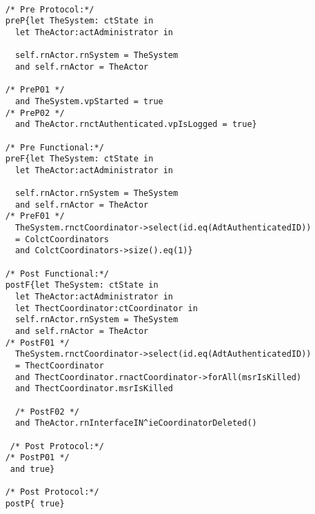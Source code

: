 	\scriptsize
	\vspace{0.5cm}
	\begin{lstlisting}[style=MessirStyle,firstnumber=auto,captionpos=b,caption={\msrmessir (MCL-oriented) specification of the operation \emph{oeDeleteCoordinator}.},label=OM-actAdministrator-oeDeleteCoordinator-MCL-LST]

	/* Pre Protocol:*/ 
	preP{let TheSystem: ctState in
	  let TheActor:actAdministrator in
	  
	  self.rnActor.rnSystem = TheSystem
	  and self.rnActor = TheActor
	  
	/* PreP01 */
	  and TheSystem.vpStarted = true
	/* PreP02 */
	  and TheActor.rnctAuthenticated.vpIsLogged = true}
	
	/* Pre Functional:*/
	preF{let TheSystem: ctState in
	  let TheActor:actAdministrator in
	   
	  self.rnActor.rnSystem = TheSystem
	  and self.rnActor = TheActor
	/* PreF01 */
	  TheSystem.rnctCoordinator->select(id.eq(AdtAuthenticatedID))
	  = ColctCoordinators
	  and ColctCoordinators->size().eq(1)}
	
	/* Post Functional:*/ 
	postF{let TheSystem: ctState in
	  let TheActor:actAdministrator in
	  let ThectCoordinator:ctCoordinator in
	  self.rnActor.rnSystem = TheSystem
	  and self.rnActor = TheActor
	/* PostF01 */
	  TheSystem.rnctCoordinator->select(id.eq(AdtAuthenticatedID))
	  = ThectCoordinator
	  and ThectCoordinator.rnactCoordinator->forAll(msrIsKilled)
	  and ThectCoordinator.msrIsKilled
	 
	  /* PostF02 */
	  and TheActor.rnInterfaceIN^ieCoordinatorDeleted()
	
	 /* Post Protocol:*/
	/* PostP01 */
	 and true}
	
	/* Post Protocol:*/ 
	postP{ true}
	
	\end{lstlisting}
	\normalsize 
	
	
	
	





